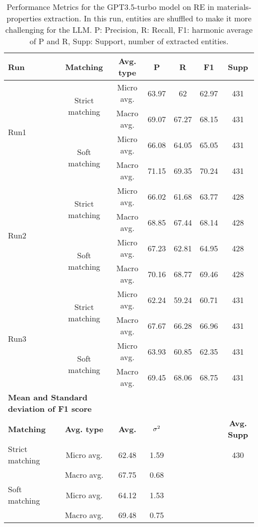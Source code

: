 \begin{table}[htbp]
    \small
    \centering
    \caption{Performance Metrics for the GPT3.5-turbo model on RE in materials-properties extraction. In this run, entities are shuffled to make it more challenging for the LLM. P: Precision, R: Recall, F1: harmonic average of P and R, Supp: Support, number of extracted entities.}
    \begin{tabular}{lcccccc}
        \toprule
        \textbf{Run} & \textbf{Matching} & \textbf{Avg. type} & \textbf{P} & \textbf{R} & \textbf{F1} & \textbf{Supp} \\
        \midrule
        \multirow{4}{*}{Run1} & \multirow{2}{*}{Strict matching} & Micro avg. & 63.97 & 62 & 62.97 & 431 \\
        & & Macro avg. & 69.07 & 67.27 & 68.15 & 431 \\
        \cmidrule{2-7}
        & \multirow{2}{*}{Soft matching} & Micro avg. & 66.08 & 64.05 & 65.05 & 431 \\
        & & Macro avg. & 71.15 & 69.35 & 70.24 & 431 \\
        \midrule
        \multirow{4}{*}{Run2} & \multirow{2}{*}{Strict matching} & Micro avg. & 66.02 & 61.68 & 63.77 & 428 \\
        & & Macro avg. & 68.85 & 67.44 & 68.14 & 428 \\
        \cmidrule{2-7}
        & \multirow{2}{*}{Soft matching} & Micro avg. & 67.23 & 62.81 & 64.95 & 428 \\
        & & Macro avg. & 70.16 & 68.77 & 69.46 & 428 \\
        \midrule
        \multirow{4}{*}{Run3} & \multirow{2}{*}{Strict matching} & Micro avg. & 62.24 & 59.24 & 60.71 & 431 \\
        & & Macro avg. & 67.67 & 66.28 & 66.96 & 431 \\
        \cmidrule{2-7}
        & \multirow{2}{*}{Soft matching} & Micro avg. & 63.93 & 60.85 & 62.35 & 431 \\
        & & Macro avg. & 69.45 & 68.06 & 68.75 & 431 \\
        \midrule
        \multicolumn{2}{l}{\textbf{Mean and Standard deviation of F1 score}} & & & & & \\
        \midrule
        \textbf{Matching} & \textbf{Avg. type} & \textbf{Avg.} & $\sigma\textsuperscript{2}$ & & & \textbf{Avg. Supp}\\
        Strict matching & Micro avg. & 62.48 & 1.59 & & & 430 \\
        & Macro avg. & 67.75 & 0.68 & & & \\
        Soft matching & Micro avg. & 64.12 & 1.53 & & \\
        & Macro avg. & 69.48 & 0.75 & & \\
        \bottomrule
    \end{tabular}
\end{table}

